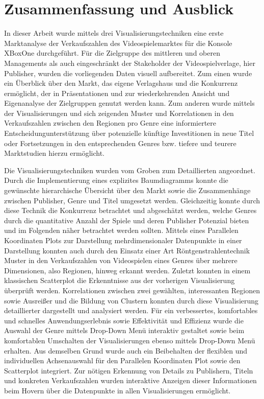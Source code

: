 \documentclass[usegeometry=true]{scrartcl}
\begin{document}
\section{Zusammenfassung und Ausblick}
In dieser Arbeit wurde mittels drei Visualisierungstechniken eine erste Marktanalyse der Verkaufszahlen des Videospielemarktes für die Konsole XBoxOne durchgeführt. 
Für die Zielgruppe des mittleren und oberen Managements als auch eingeschränkt der Stakeholder der Videospielverlage, hier Publisher, wurden die vorliegenden Daten visuell aufbereitet. 
Zum einen wurde ein Überblick über den Markt, das eigene Verlagshaus und die Konkurrenz ermöglicht, der in Präsentationen und zur wiederkehrenden Ansicht und Eigenanalyse der Zielgruppen genutzt werden kann.
Zum anderen wurde mittels der Visualisierungen und sich zeigenden Muster und Korrelationen in den Verkaufszahlen zwischen den Regionen pro Genre eine informiertere Entscheidungunterstützung über potenzielle künftige Investitionen in neue Titel oder Fortsetzungen in den entsprechenden Genres bzw. tiefere und teurere Marktstudien hierzu ermöglicht.

Die Visualisierungstechniken wurden vom Groben zum Detaillierten angeordnet. 
Durch die Implementierung eines explizites Baumdiagramms konnte die gewünschte hierarchische Übersicht über den Markt sowie die Zusammenhänge zwischen Publisher, Genre und Titel umgesetzt werden.
Gleichzeitig konnte durch diese Technik die Konkurrenz betrachtet und abgeschätzt werden, welche Genres durch die quantitative Anzahl der Spiele und deren Publisher Potenzial bieten und im Folgenden näher betrachtet werden sollten.
Mittels eines Parallelen Koordinaten Plots zur Darstellung mehrdimensionaler Datenpunkte in einer Darstellung konnten auch durch den Einsatz einer Art Röntgenstrahlentechnik Muster in den Verkaufszahlen von Videospielen eines Genres über mehrere Dimensionen, also Regionen, hinweg erkannt werden.
Zuletzt konnten in einem klassischen Scatterplot die Erkenntnisse aus der vorherigen Visualisierung überprüft werden. 
Korrelationen zwischen zwei gewählten, interessanten Regionen sowie Ausreißer und die Bildung von Clustern konnten durch diese Visualisierung detaillierter dargestellt und analysiert werden.
Für ein verbessertes, komfortables und schnelles Anwendungserlebnis sowie Effektivität und Effizienz wurde die Auswahl der Genre mittels Drop-Down Menü interaktiv gestaltet sowie beim komfortablen Umschalten der Visualisierungen ebenso mittels Drop-Down Menü erhalten.
Aus demselben Grund wurde auch ein Beibehalten der flexiblen und individuellen Achsenauswahl für den Parallelen Koordinaten Plot sowie den Scatterplot integriert.
Zur nötigen Erkennung von Details zu Publishern, Titeln und konkreten Verkaufszahlen wurden interaktive Anzeigen dieser Informationen beim Hovern über die Datenpunkte in allen Visualisierungen ermöglicht.
\end{document}
